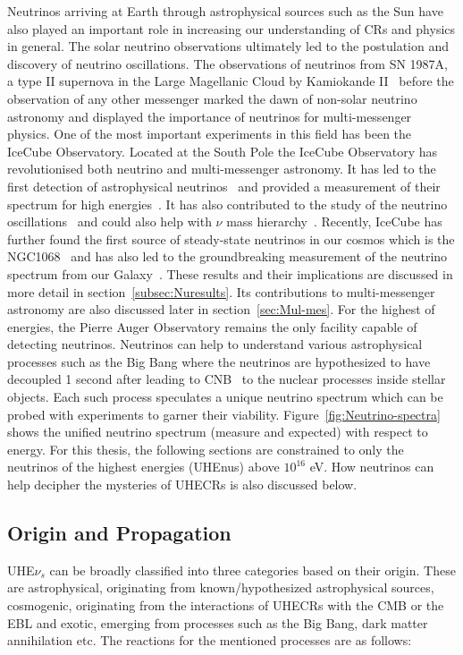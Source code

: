 Neutrinos arriving at Earth through astrophysical sources such as the Sun have also played an important role in increasing our understanding of \glspl{CR} and physics in general. The solar neutrino observations ultimately led to the postulation and discovery of neutrino oscillations. The observations of neutrinos from SN 1987A, a type II supernova in the Large Magellanic Cloud by Kamiokande II~\cite{PhysRevLett.58.1490} before the observation of any other messenger marked the dawn of non-solar neutrino astronomy and displayed the importance of neutrinos for multi-messenger physics. One of the most important experiments in this field has been the IceCube Observatory. Located at the South Pole the IceCube Observatory has revolutionised both neutrino and multi-messenger astronomy. It has led to the first detection of astrophysical neutrinos~\cite{PhysRevLett.111.021103} and provided a measurement of their spectrum for high energies~\cite{doi:10.1126/science.1242856}. It has also contributed to the study of the neutrino oscillations~\cite{Abbasi_2023_Oscillation} and could also help with $\nu$ mass hierarchy~\cite{psf2023008007}. Recently, IceCube has further found the first source of steady-state neutrinos in our cosmos which is the NGC1068~\cite{Icecube_2022} and has also led to the groundbreaking measurement of the neutrino spectrum from our Galaxy~\cite{Galactic_plane_nu_2023}. These results and their implications are discussed in more detail in section~\ref{subsec:Nuresults}. Its contributions to multi-messenger astronomy are also discussed later in section~\ref{sec:Mul-mes}. For the highest of energies, the Pierre Auger Observatory remains the only facility capable of detecting neutrinos. 
Neutrinos can help to understand various astrophysical processes such as the Big Bang where the neutrinos are hypothesized to have decoupled 1 second after leading to \gls{CNB}~\cite{scott2024cosmicneutrinobackground} to the nuclear processes inside stellar objects. Each such process speculates a unique neutrino spectrum which can be probed with experiments to garner their viability. Figure~\ref{fig:Neutrino-spectra} shows the unified neutrino spectrum (measure and expected) with respect to energy. For this thesis, the following sections are constrained to only the neutrinos of the highest energies (\glspl{UHEnu}) above $10^{16}$ eV. How neutrinos can help decipher the mysteries of \glspl{UHECR} is also discussed below.

\subsection{Origin and Propagation}
\label{subsec:nuorig}
UHE$\nu_s$ can be broadly classified into three categories based on their origin. These are astrophysical, originating from known/hypothesized astrophysical sources, cosmogenic, originating from the interactions of \glspl{UHECR} with the \gls{CMB} or the \gls{EBL} and exotic, emerging from processes such as the Big Bang, dark matter annihilation etc. The reactions for the mentioned processes are as follows:


